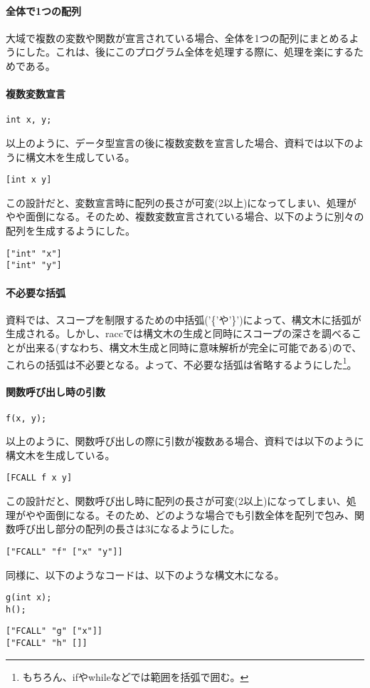 \documentclass[titlepage, a4paper,12pt]{jarticle}
\begin{document}
\paragraph{全体で1つの配列}
大域で複数の変数や関数が宣言されている場合、全体を1つの配列にまとめるようにした。これは、後にこのプログラム全体を処理する際に、処理を楽にするためである。
\paragraph{複数変数宣言}
\begin{verbatim}
int x, y;
\end{verbatim}
以上のように、データ型宣言の後に複数変数を宣言した場合、資料では以下のように構文木を生成している。
\begin{verbatim}
[int x y]
\end{verbatim}
この設計だと、変数宣言時に配列の長さが可変(2以上)になってしまい、処理がやや面倒になる。そのため、複数変数宣言されている場合、以下のように別々の配列を生成するようにした。
\begin{verbatim}
["int" "x"]
["int" "y"]
\end{verbatim}
\paragraph{不必要な括弧}
資料では、スコープを制限するための中括弧('\{'や'\}')によって、構文木に括弧が生成される。しかし、raccでは構文木の生成と同時にスコープの深さを調べることが出来る(すなわち、構文木生成と同時に意味解析が完全に可能である)ので、これらの括弧は不必要となる。よって、不必要な括弧は省略するようにした\footnote{もちろん、ifやwhileなどでは範囲を括弧で囲む。}。
\paragraph{関数呼び出し時の引数}
\begin{verbatim}
f(x, y);
\end{verbatim}
以上のように、関数呼び出しの際に引数が複数ある場合、資料では以下のように構文木を生成している。
\begin{verbatim}
[FCALL f x y]
\end{verbatim}
この設計だと、関数呼び出し時に配列の長さが可変(2以上)になってしまい、処理がやや面倒になる。そのため、どのような場合でも引数全体を配列で包み、関数呼び出し部分の配列の長さは3になるようにした。
\begin{verbatim}
["FCALL" "f" ["x" "y"]]
\end{verbatim}
同様に、以下のようなコードは、以下のような構文木になる。
\begin{verbatim}
g(int x);
h();
\end{verbatim}
\begin{verbatim}
["FCALL" "g" ["x"]]
["FCALL" "h" []]
\end{verbatim}
\end{document}
